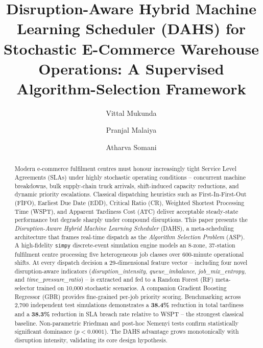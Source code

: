 \documentclass[3p,times]{elsarticle}
\begin{document}
\begin{frontmatter}

\title{Disruption-Aware Hybrid Machine Learning Scheduler (DAHS)
       for Stochastic E-Commerce Warehouse Operations:
       A Supervised Algorithm-Selection Framework%
       }


\author[RVCE]{Vittal Mukunda}

\author[RVCE]{Pranjal Malaiya}

\author[RVCE]{Atharva Somani}


\address[RVCE]{Department of Industrial Engineering and Management,
  R.V.\ College of Engineering, Mysuru Road,
  Bengaluru -- 560~059, Karnataka, India}

\begin{abstract}
Modern e-commerce fulfilment centres must honour increasingly tight
Service Level Agreements (SLAs) under highly stochastic operating
conditions -- concurrent machine breakdowns, bulk supply-chain truck
arrivals, shift-induced capacity reductions, and dynamic priority
escalations.  Classical dispatching heuristics such as
First-In-First-Out (FIFO), Earliest Due Date (EDD), Critical Ratio
(CR), Weighted Shortest Processing Time (WSPT), and Apparent
Tardiness Cost (ATC) deliver acceptable steady-state performance
but degrade sharply under compound disruptions.  This paper
presents the \textit{Disruption-Aware Hybrid Machine Learning
Scheduler} (DAHS), a meta-scheduling architecture that frames
real-time dispatch as the \textit{Algorithm Selection Problem}
(ASP).  A high-fidelity \texttt{simpy} discrete-event simulation
engine models an 8-zone, 37-station fulfilment centre processing
five heterogeneous job classes over 600-minute operational shifts.
At every dispatch decision a 29-dimensional feature vector --
including four novel disruption-aware indicators
(\textit{disruption\_intensity}, \textit{queue\_imbalance},
\textit{job\_mix\_entropy}, and \textit{time\_pressure\_ratio}) --
is extracted and fed to a Random Forest (RF) meta-selector trained
on 10{,}000 stochastic scenarios.  A companion Gradient Boosting
Regressor (GBR) provides fine-grained per-job priority scoring.
Benchmarking across 2{,}700 independent test simulations demonstrates
a \textbf{38.4\%} reduction in total tardiness and a \textbf{38.3\%}
reduction in SLA breach rate relative to WSPT -- the strongest
classical baseline.  Non-parametric Friedman and post-hoc Nemenyi
tests confirm statistically significant dominance ($p < 0.0001$).
The DAHS advantage grows monotonically with disruption intensity,
validating its core design hypothesis.
\end{abstract}


\end{frontmatter}
\end{document}
